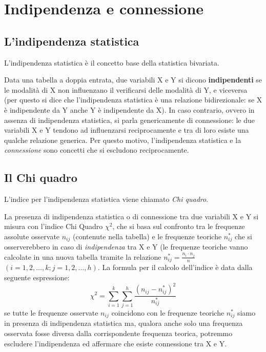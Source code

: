 \section{Indipendenza e connessione}
\label{sec:stat02_indipendenza_connessione}

\subsection{L'indipendenza statistica}
\label{subsec:stat02_indipendenza}

L'indipendenza statistica è il concetto base della statistica bivariata.

Data una tabella a doppia entrata, due variabili X e Y si dicono 
\textbf{indipendenti} se le modalità di X non influenzano il verificarsi 
delle modalità di Y, e viceversa (per questo si dice che l'indipendenza 
statistica è una relazione bidirezionale: se X è indipendente da Y anche Y 
è indipendente da X). In caso contrario, ovvero in assenza di indipendenza 
statistica, si parla genericamente di connessione: le due variabili X e Y 
tendono ad influenzarsi reciprocamente e tra di loro esiste una qualche 
relazione generica. Per questo motivo, l'indipendenza statistica e la 
\emph{connessione} sono concetti che si escludono reciprocamente.

\subsection{Il Chi quadro}
\label{subsec:stat02_chiquadro}

L'indice per l'indipendenza statistica viene chiamato \emph{Chi quadro}.

La presenza di indipendenza statistica o di connessione tra due variabili X 
e Y si misura con l'indice Chi Quadro \(\chi^2\), che si basa sul confronto 
tra le frequenze assolute osservate  \(n_{ij}\) (contenute nella tabella) e 
le frequenze teoriche \(n^*_{ij}\) che si osserverebbero in caso di 
\emph{indipendenza} tra X e Y (le frequenze teoriche vanno calcolate 
in una nuova tabella  tramite la relazione \(n^*_{ij}=\frac{n_i\cdot 
n_j}{n}\) \((i=1,2,\dots,k; j=1,2,\dots,h)\). La formula per il calcolo 
dell'indice è data dalla seguente espressione: 
\[\chi^2 = \sum_{i=1}^{k}\sum_{j=1}^{h}\frac{\left(n_{ij}-n^*_{ij}\right) 
^2}{n^*_{ij}}\]
se tutte le frequenze osservate \(n_{ij}\) coincidono con le frequenze 
teoriche \(n^*_{ij}\) siamo in presenza di indipendenza statistica ma, 
qualora anche solo una frequenza osservata fosse diversa dalla 
corrispondente frequenza teorica, potremmo escludere l'indipendenza ed 
affermare che esiste connessione tra X e Y.

